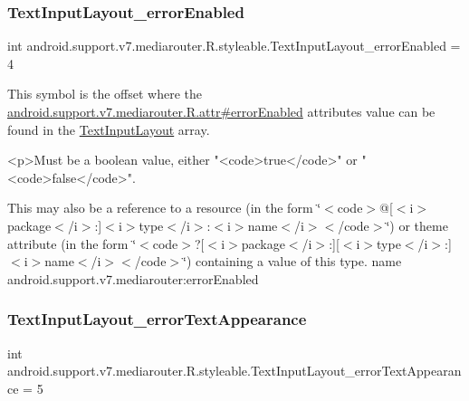 \subsubsection{\texorpdfstring{Text\+Input\+Layout\+\_\+error\+Enabled}{TextInputLayout\_errorEnabled}}
{\footnotesize\ttfamily int android.\+support.\+v7.\+mediarouter.\+R.\+styleable.\+Text\+Input\+Layout\+\_\+error\+Enabled = 4\hspace{0.3cm}{\ttfamily [static]}}

This symbol is the offset where the \hyperlink{classandroid_1_1support_1_1v7_1_1mediarouter_1_1R_1_1attr_a81a698eb10c6fa3e9765f39b03bff723}{android.\+support.\+v7.\+mediarouter.\+R.\+attr\#error\+Enabled} attribute\textquotesingle{}s value can be found in the \hyperlink{classandroid_1_1support_1_1v7_1_1mediarouter_1_1R_1_1styleable_a935a5feb3f0394eb1c07f26b207dfb2d}{Text\+Input\+Layout} array.

\begin{DoxyVerb}      <p>Must be a boolean value, either "<code>true</code>" or "<code>false</code>".
\end{DoxyVerb}
 

This may also be a reference to a resource (in the form \char`\"{}$<$code$>$@\mbox{[}$<$i$>$package$<$/i$>$\+:\mbox{]}$<$i$>$type$<$/i$>$\+:$<$i$>$name$<$/i$>$$<$/code$>$\char`\"{}) or theme attribute (in the form \char`\"{}$<$code$>$?\mbox{[}$<$i$>$package$<$/i$>$\+:\mbox{]}\mbox{[}$<$i$>$type$<$/i$>$\+:\mbox{]}$<$i$>$name$<$/i$>$$<$/code$>$\char`\"{}) containing a value of this type.  name android.\+support.\+v7.\+mediarouter\+:error\+Enabled \mbox{\label{classandroid_1_1support_1_1v7_1_1mediarouter_1_1R_1_1styleable_ae6737e6924f3c3da1826890fae0f258b}} 
\subsubsection{\texorpdfstring{Text\+Input\+Layout\+\_\+error\+Text\+Appearance}{TextInputLayout\_errorTextAppearance}}
{\footnotesize\ttfamily int android.\+support.\+v7.\+mediarouter.\+R.\+styleable.\+Text\+Input\+Layout\+\_\+error\+Text\+Appearance = 5\hspace{0.3cm}{\ttfamily [static]}}

